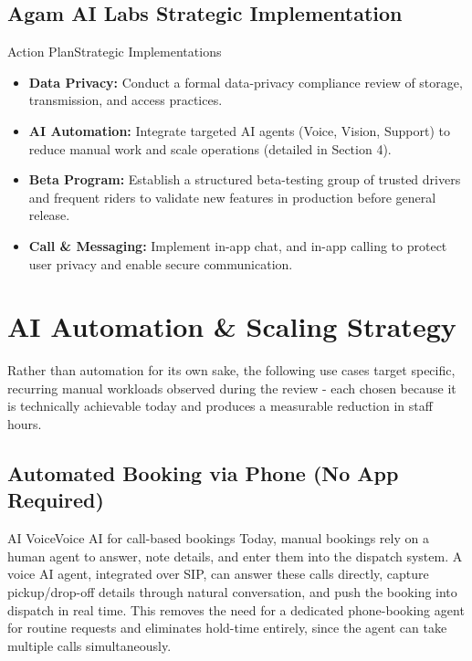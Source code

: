 \documentclass[11pt,a4paper]{article}
\begin{document}
\subsection{Agam AI Labs Strategic Implementation}
\begin{recbox}{Action Plan}{Strategic Implementations}
\begin{itemize}
  \item \textbf{Data Privacy:} Conduct a formal data-privacy compliance review of storage, transmission, and access practices.
  \item \textbf{AI Automation:} Integrate targeted AI agents (Voice, Vision, Support) to reduce manual work and scale operations (detailed in Section 4).
  \item \textbf{Beta Program:} Establish a structured beta-testing group of trusted drivers and frequent riders to validate new features in production before general release.
  \item \textbf{Call \& Messaging:} Implement in-app chat, and in-app calling to protect user privacy and enable secure communication.
\end{itemize}
\end{recbox}

\section{AI Automation \& Scaling Strategy}
Rather than automation for its own sake, the following use cases target specific, recurring manual workloads observed during the review - each chosen because it is technically achievable today and produces a measurable reduction in staff hours.

\subsection{Automated Booking via Phone (No App Required)}
\begin{recbox}{AI Voice}{Voice AI for call-based bookings}
Today, manual bookings rely on a human agent to answer, note details, and enter them into the dispatch system. A voice AI agent, integrated over SIP, can answer these calls directly, capture pickup/drop-off details through natural conversation, and push the booking into dispatch in real time. This removes the need for a dedicated phone-booking agent for routine requests and eliminates hold-time entirely, since the agent can take multiple calls simultaneously.
\end{recbox}
\end{document}
